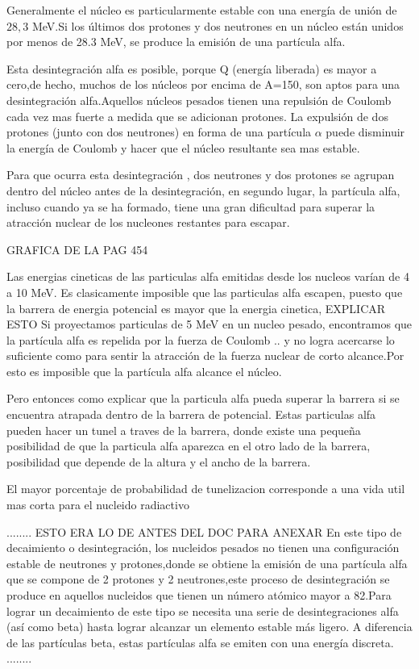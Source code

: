 \documentclass[12pt,fleqn]{book} %
\numberwithin{equation}{section} %
\numberwithin{figure}{section} %
\numberwithin{table}{section} %
\begin{document}
Generalmente el núcleo es particularmente estable con una energía de unión de $28,3$ MeV.Si los últimos dos protones y dos neutrones en un núcleo están unidos por menos de 28.3 MeV, se produce la emisión de una partícula alfa.

Esta desintegración alfa es posible, porque Q (energía liberada) es mayor a cero,de hecho, muchos de los núcleos por encima de  A=150, son aptos para una desintegración alfa.Aquellos núcleos pesados tienen una repulsión de Coulomb cada vez mas fuerte a medida que se adicionan protones. La expulsión de dos protones (junto con dos neutrones)  en forma de una partícula  $\alpha$  puede disminuir la energía de Coulomb y hacer que el núcleo resultante sea mas estable.

Para que ocurra esta desintegración , dos neutrones y dos protones se agrupan dentro del núcleo antes de la desintegración, en segundo lugar, la partícula alfa, incluso cuando ya se ha formado, tiene una gran dificultad para superar la atracción nuclear de los nucleones restantes para escapar.

GRAFICA DE LA PAG 454

Las energias cineticas de las particulas alfa emitidas desde los nucleos varían de 4 a 10 MeV. Es clasicamente imposible que las particulas alfa escapen, puesto que  la barrera de energia potencial es mayor que la energia cinetica,
EXPLICAR ESTO
Si proyectamos particulas de 5 MeV en un nucleo pesado, encontramos que la partícula alfa es repelida por la fuerza de Coulomb
..
y no logra acercarse lo suficiente como para sentir la atracción de la fuerza nuclear de corto alcance.Por esto es imposible que la partícula alfa alcance el núcleo. 


Pero entonces como explicar que la particula alfa pueda superar la barrera si se encuentra atrapada dentro de la barrera de potencial. Estas  particulas alfa pueden hacer un tunel a traves de la barrera, donde existe una pequeña  posibilidad de que la particula alfa aparezca en el otro lado de la barrera, posibilidad que depende de la altura y el ancho de la barrera.

El mayor porcentaje de probabilidad de tunelizacion corresponde a una vida util mas corta para el nucleido radiactivo

........
ESTO ERA LO DE ANTES DEL DOC PARA ANEXAR
En este tipo de decaimiento o desintegración, los nucleidos pesados no tienen una configuración estable de neutrones y protones,donde se obtiene la emisión de una partícula alfa que se compone de 2 protones y 2 neutrones,este proceso de desintegración se produce en aquellos nucleidos que tienen  un número atómico mayor a 82.Para lograr un decaimiento de este tipo se necesita una serie de desintegraciones alfa (así como beta) hasta lograr alcanzar un elemento estable más ligero. A diferencia de las partículas beta, estas partículas alfa se emiten con una energía discreta.
........
\end{document}
